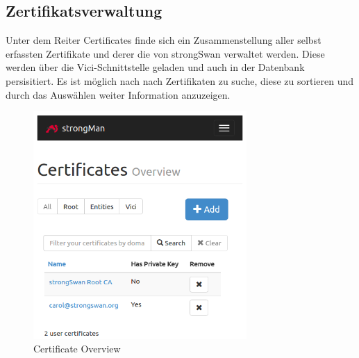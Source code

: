 \noindent\begin{minipage}[t]{0.5\textwidth}
\vspace{0pt}
\subsection{Zertifikatsverwaltung}
Unter dem Reiter Certificates finde sich ein Zusammenstellung aller selbst erfassten Zertifikate und derer die von strongSwan verwaltet werden. Diese werden über die Vici-Schnittstelle geladen und auch in der Datenbank persisitiert. Es ist möglich nach nach Zertifikaten zu suche, diese zu sortieren und durch das Auswählen weiter Information anzuzeigen.
\end{minipage}
\hfill
\begin{minipage}[t]{0.5\textwidth}
\vspace{0pt}
    \begin{figure}[H]
    	\centering
    	\includegraphics[width=230pt]{images/certificate_overview.png}
    	\caption{Certificate Overview}
    \end{figure}
\end{minipage}
\newpage

